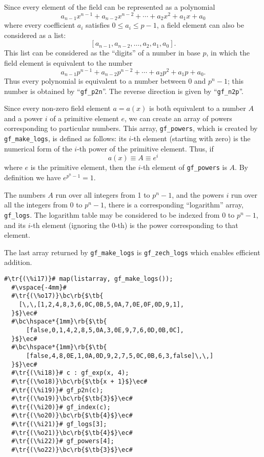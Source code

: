 \documentclass[a4paper,11pt,leqno,fleqn]{artikel3}
\newcommand{\bc}{\begin{center}}
\newcommand{\ec}{\end{center}}
\newcommand{\tr}[1]{\textcolor{red}{#1}}
\newcommand{\tb}[1]{\textcolor{blue}{#1}}
\newcommand{\rb}[1]{\raisebox{2mm}[0mm][1mm]{#1}}
\begin{document}
Since every element of the field can be represented as a polynomial
\[
a_{n-1}x^{n-1}+a_{n-2}x^{n-2}+\cdots+a_2x^2+a_1x+a_0
\]
where every coefficient $a_i$ satisfies $0\le a_i\le p-1$, a field element can
also be considered as a list:
\[
[a_{n-1},a_{n-2},\ldots,a_2,a_1,a_0].
\]
This list can be considered as the ``digits'' of a number in base $p$, in
which the field element is equivalent to the number
\[
a_{n-1}p^{n-1}+a_{n-2}p^{n-2}+\cdots+a_2p^2+a_1p+a_0.
\]
Thus every polynomial is equivalent to a number between 0 and $p^n-1$; this
number is obtained by ``\texttt{gf\_p2n}''. 
The reverse direction is given by ``\texttt{gf\_n2p}''.

Since every non-zero field element $a=a(x)$ is both equivalent to a number $A$
and a power $i$ of a primitive element $e$, we can create an array of powers
corresponding to particular numbers.  This array, \texttt{gf\_powers},
which is created by \verb!gf_make_logs!, 
is defined as follows: 
its $i$-th element (starting with zero) is the numerical form of the $i$-th power of the 
primitive element.  Thus, if
\[
a(x)\equiv A\equiv e^i
\]
where $e$ is the primitive element, then the $i$-th element of \texttt{gf\_powers} is
$A$.  By definition we have $e^{p^n-1}=1$.

The numbers $A$ run over all integers from 1 to $p^n-1$, and the powers $i$
run over all the integers from 0 to $p^n-1$, there is a corresponding
``logarithm'' array, \texttt{gf\_logs}.  
The logarithm table may be considered to be
indexed from 0 to $p^n-1$, and its $i$-th element (ignoring the 0-th) is the power 
corresponding to that element.

The last array returned by \verb!gf_make_logs! is \verb!gf_zech_logs! 
which enables efficient addition. 

\vspace*{2mm}
\begin{lstlisting}[escapechar=\#]
  #\tr{(\%i17)}# map(listarray, gf_make_logs());
  #\vspace{-4mm}#
  #\tr{(\%o17)}\bc\rb{$\tb{
    [\,\,[1,2,4,8,3,6,0C,0B,5,0A,7,0E,0F,0D,9,1], 
  }$}\ec#
  #\bc\hspace*{1mm}\rb{$\tb{
      [false,0,1,4,2,8,5,0A,3,0E,9,7,6,0D,0B,0C],
  }$}\ec#
  #\bc\hspace*{1mm}\rb{$\tb{
      [false,4,8,0E,1,0A,0D,9,2,7,5,0C,0B,6,3,false]\,\,]
  }$}\ec#
  #\tr{(\%i18)}# c : gf_exp(x, 4);
  #\tr{(\%o18)}\bc\rb{$\tb{x + 1}$}\ec#
  #\tr{(\%i19)}# gf_p2n(c);
  #\tr{(\%o19)}\bc\rb{$\tb{3}$}\ec#
  #\tr{(\%i20)}# gf_index(c);
  #\tr{(\%o20)}\bc\rb{$\tb{4}$}\ec#
  #\tr{(\%i21)}# gf_logs[3];
  #\tr{(\%o21)}\bc\rb{$\tb{4}$}\ec#
  #\tr{(\%i22)}# gf_powers[4];
  #\tr{(\%o22)}\bc\rb{$\tb{3}$}\ec#
\end{lstlisting}
\end{document}
